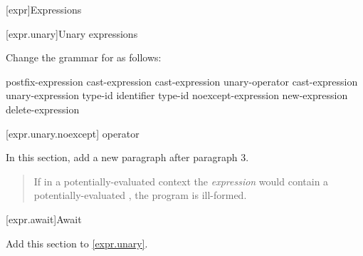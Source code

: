 

\setcounter{chapter}{4}
[expr]{Expressions}

\setcounter{section}{2}
[expr.unary]{Unary expressions}


Change the grammar for  as follows:

\begin{bnf}
	\br
	postfix-expression\br
	\terminal{++} cast-expression\br
	\terminal{-{-}} cast-expression\br
	\br
	unary-operator cast-expression\br
	 unary-expression\br
	 type-id \terminal{)}\br
	 \terminal{(} identifier \terminal{)}\br
	 type-id \terminal{)}\br
	noexcept-expression\br
	new-expression\br
	delete-expression\br
\end{bnf}

\setcounter{subsection}{6}
[expr.unary.noexcept]{ operator}


In this section, add a new paragraph after paragraph 3.

\begin{quote}
\setcounter{Paras}{3}
\pnum
If in a potentially-evaluated context the \textit{expression} would contain a potentially-evaluated , the program is ill-formed.
\end{quote}

\setcounter{subsection}{7}
[expr.await]{Await}

Add this section to \ref{expr.unary}.

